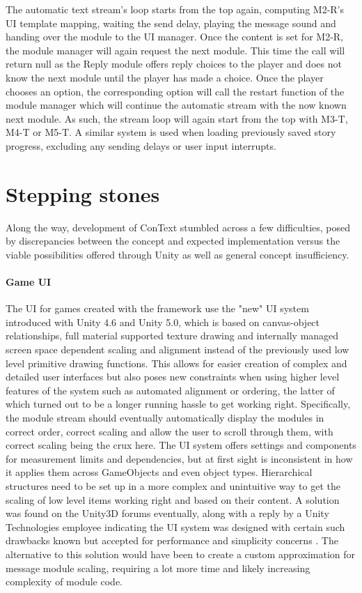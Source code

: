 The automatic text stream's loop starts from the top again, computing M2-R's UI template mapping, waiting the send delay, playing the message sound and handing over the module to the UI manager. Once the content is set for M2-R, the module manager will again request the next module. This time the call will return null as the Reply module offers reply choices to the player and does not know the next module until the player has made a choice. Once the player chooses an option, the corresponding option will call the restart function of the module manager which will continue the automatic stream with the now known next module. 
As such, the stream loop will again start from the top with M3-T, M4-T or M5-T. 
A similar system is used when loading previously saved story progress, excluding any sending delays or user input interrupts. 

\section{Stepping stones}
Along the way, development of ConText stumbled across a few difficulties, posed by discrepancies between the concept and expected implementation versus the viable possibilities offered through Unity as well as general concept insufficiency. 
\paragraph{Game UI} The UI for games created with the framework use the "new" UI system introduced with Unity 4.6 and Unity 5.0, which is based on canvas-object relationships, full material supported texture drawing and internally managed screen space dependent scaling and alignment instead of the previously used low level primitive drawing functions. This allows for easier creation of complex and detailed user interfaces but also poses new constraints when using higher level features of the system such as automated alignment or ordering, the latter of which turned out to be a longer running hassle to get working right. Specifically, the module stream should eventually automatically display the modules in correct order, correct scaling and allow the user to scroll through them, with correct scaling being the crux here. The UI system offers settings and components for measurement limits and dependencies, but at first sight is inconsistent in how it applies them across GameObjects and even object types. Hierarchical structures need to be set up in a more complex and unintuitive way to get the scaling of low level items working right and based on their content. A solution was found on the Unity3D forums eventually, along with a reply by a Unity Technologies employee indicating the UI system was designed with certain such drawbacks known but accepted for performance and simplicity concerns \cite{U3DC1}. The alternative to this solution would have been to create a custom approximation for message module scaling, requiring a lot more time and likely increasing complexity of module code.
